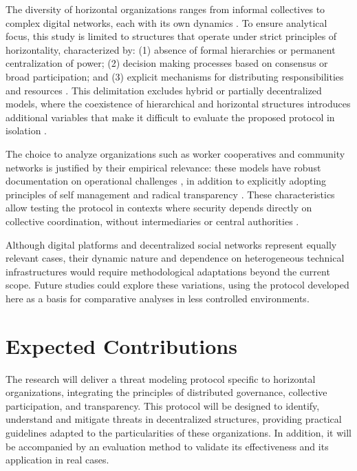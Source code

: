 The diversity of horizontal organizations ranges from informal collectives to
complex digital networks, each with its own dynamics \cite{EverydayRevolutions}.
To ensure analytical focus, this study is limited to structures that operate
under strict principles of horizontality, characterized by: (1) absence of
formal hierarchies or permanent centralization of power; (2) decision making
processes based on consensus or broad participation; and (3) explicit mechanisms
for distributing responsibilities and resources \cite{Colbac}. This delimitation
excludes hybrid or partially decentralized models, where the coexistence of
hierarchical and horizontal structures introduces additional variables that make
it difficult to evaluate the proposed protocol in isolation
\cite{Non-HierarchicalForms}.

The choice to analyze organizations such as worker cooperatives and community
networks is justified by their empirical relevance: these models have robust
documentation on operational challenges \cite{WorkerCooperativesinAmerica}, in
addition to explicitly adopting principles of self management and radical
transparency \cite{EverydayRevolutions}. These characteristics allow testing the
protocol in contexts where security depends directly on collective coordination,
without intermediaries or central authorities
\cite{ThreatModelingdesigningForSecurity}.

Although digital platforms and decentralized social networks
\cite{CreatingTheCollectiveSocialMedia} represent equally relevant cases, their
dynamic nature and dependence on heterogeneous technical infrastructures would
require methodological adaptations beyond the current scope. Future studies
could explore these variations, using the protocol developed here as a basis for
comparative analyses in less controlled environments.


\section{Expected Contributions}
\label{sec:expected_contributions}

The research will deliver a threat modeling protocol specific to horizontal
organizations, integrating the principles of distributed governance, collective
participation, and transparency. This protocol will be designed to
identify, understand and mitigate threats in decentralized structures, providing
practical guidelines adapted to the particularities of these organizations. In
addition, it will be accompanied by an evaluation method to validate its
effectiveness and its application in real cases.

